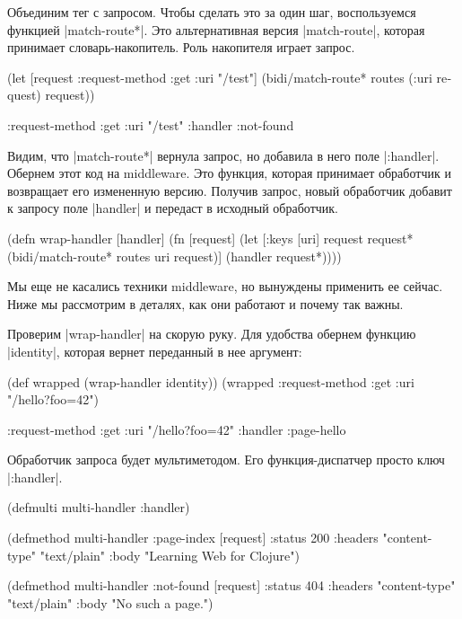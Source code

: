 Объединим тег с запросом. Чтобы сделать это за один шаг, воспользуемся функцией
\spverb|match-route*|. Это альтернативная версия \spverb|match-route|, которая
принимает словарь-накопитель. Роль накопителя играет запрос.

\begin{english}
  \begin{clojure}
(let [request {:request-method :get
               :uri "/test"}]
  (bidi/match-route* routes (:uri request) request))

{:request-method :get
 :uri "/test"
 :handler :not-found}
  \end{clojure}
\end{english}

Видим, что \spverb|match-route*| вернула запрос, но добавила в него поле
\spverb|:handler|. Обернем этот код на middleware. Это функция, которая
принимает обработчик и возвращает его измененную версию. Получив запрос, новый
обработчик добавит к запросу поле \spverb|handler| и передаст в исходный
обработчик.

\begin{english}
  \begin{clojure}
(defn wrap-handler [handler]
  (fn [request]
    (let [{:keys [uri]} request
          request* (bidi/match-route* routes uri request)]
      (handler request*))))
  \end{clojure}
\end{english}

Мы еще не касались техники middleware, но вынуждены применить ее сейчас. Ниже мы
рассмотрим в деталях, как они работают и почему так важны.

Проверим \spverb|wrap-handler| на скорую руку. Для удобства обернем функцию
\spverb|identity|, которая вернет переданный в нее аргумент:

\begin{english}
  \begin{clojure}
(def wrapped (wrap-handler identity))
(wrapped {:request-method :get
          :uri "/hello?foo=42"})

{:request-method :get
 :uri "/hello?foo=42"
 :handler :page-hello}
  \end{clojure}
\end{english}

Обработчик запроса будет мультиметодом. Его функция-диспатчер просто ключ
\spverb|:handler|.

\begin{english}
  \begin{clojure}
(defmulti multi-handler :handler)

(defmethod multi-handler :page-index
  [request]
  {:status 200
   :headers {"content-type" "text/plain"}
   :body "Learning Web for Clojure"})

(defmethod multi-handler :not-found
  [request]
  {:status 404
   :headers {"content-type" "text/plain"}
   :body "No such a page."})
  \end{clojure}
\end{english}

